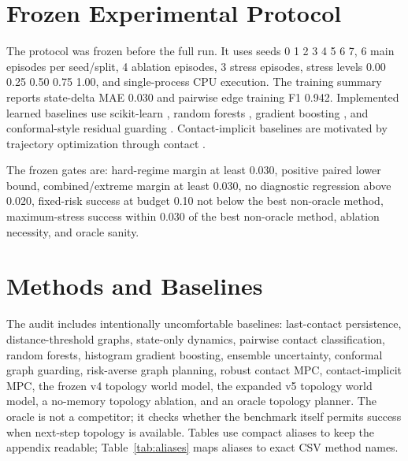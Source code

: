 \documentclass{article}
\begin{document}
\section{Frozen Experimental Protocol}
The protocol was frozen before the full run. It uses seeds 0 1 2 3 4 5 6 7, 6 main episodes per seed/split, 4 ablation episodes, 3 stress episodes, stress levels 0.00 0.25 0.50 0.75 1.00, and single-process CPU execution. The training summary reports state-delta MAE 0.030 and pairwise edge training F1 0.942. Implemented learned baselines use scikit-learn \citep{pedregosa2011scikit}, random forests \citep{breiman2001random}, gradient boosting \citep{friedman2001greedy}, and conformal-style residual guarding \citep{angelopoulos2021gentle}. Contact-implicit baselines are motivated by trajectory optimization through contact \citep{posa2014direct}.

The frozen gates are: hard-regime margin at least 0.030, positive paired lower bound, combined/extreme margin at least 0.030, no diagnostic regression above 0.020, fixed-risk success at budget 0.10 not below the best non-oracle method, maximum-stress success within 0.030 of the best non-oracle method, ablation necessity, and oracle sanity.

\section{Methods and Baselines}
The audit includes intentionally uncomfortable baselines: last-contact persistence, distance-threshold graphs, state-only dynamics, pairwise contact classification, random forests, histogram gradient boosting, ensemble uncertainty, conformal graph guarding, risk-averse graph planning, robust contact MPC, contact-implicit MPC, the frozen v4 topology world model, the expanded v5 topology world model, a no-memory topology ablation, and an oracle topology planner. The oracle is not a competitor; it checks whether the benchmark itself permits success when next-step topology is available. Tables use compact aliases to keep the appendix readable; Table~\ref{tab:aliases} maps aliases to exact CSV method names.
\end{document}
